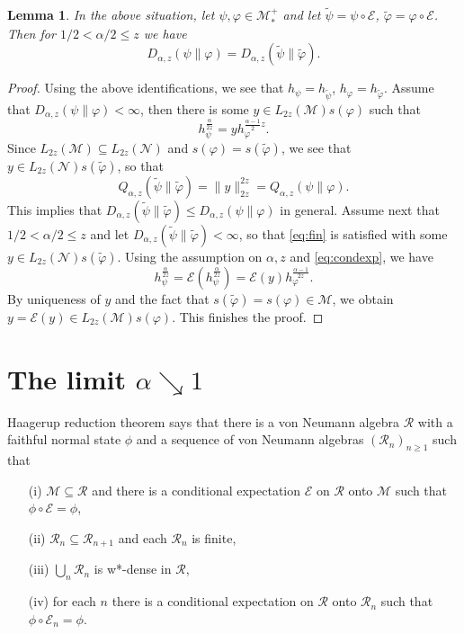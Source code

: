 \documentclass[12pt]{article}
\newtheorem{lemma}{Lemma}
\theoremstyle{definition}
\theoremstyle{remark}
\def\Me{\mathcal M}
\def\Ee{\mathcal E}
\def\Ra{\mathcal R}
\def\Ne{\mathcal N}
\begin{document}
\begin{lemma}\label{lemma:condexp} In the above situation, let $\psi,\varphi\in \Me_*^+$ and let
$\tilde\psi=\psi\circ\Ee$, $\tilde \varphi=\varphi\circ\Ee$. Then for  $1/2<\alpha/2\le z$ we
have
\[
D_{\alpha,z}(\psi\|\varphi)=D_{\alpha,z}(\tilde\psi\|\tilde\varphi).
\]

\end{lemma}


\begin{proof} Using the above identifications, we see that $h_\psi=h_{\tilde\psi}$,
$h_\varphi=h_{\tilde\varphi}$. Assume that $D_{\alpha,z}(\psi\|\varphi) <\infty$, then
there is some $y\in L_{2z}(\Me)s(\varphi)$ such that 
\begin{equation}\label{eq:fin}
h_\psi^{\frac{\alpha}{2z}}=yh_\varphi^{\frac{\alpha-1}2z}.
\end{equation}
Since $L_{2z}(\Me)\subseteq L_{2z}(\Ne)$ and $s(\varphi)=s(\tilde\varphi)$, we see that $y\in L_{2z}(\Ne)s(\tilde\varphi)$, so that
\[
Q_{\alpha,z}(\tilde\psi\|\tilde \varphi)=\|y\|_{2z}^{2z}=Q_{\alpha,z}(\psi\|\varphi).
\]
This implies that $D_{\alpha,z}(\tilde\psi\|\tilde \varphi)\le D_{\alpha,z}(\psi\|\varphi)$ in
general. Assume next that $1/2<\alpha/2\le z$ and let
$D_{\alpha,z}(\tilde\psi\|\tilde \varphi)<\infty$, so that \eqref{eq:fin} is satisfied with
some $y\in L_{2z}(\Ne)s(\tilde \varphi)$. Using the assumption on $\alpha,z$ and 
\eqref{eq:condexp}, we have
\[
h^{\frac{\alpha}{2z}}_{\psi}=\Ee(h_{\psi}^{\frac{\alpha}{2z}})=\Ee(y)h_\varphi^{\frac{\alpha-1}{2z}}.
\]
By uniqueness of $y$ and the fact
that $s(\tilde\varphi)=s(\varphi)\in \Me$, we obtain $y=\Ee(y)\in L_{2z}(\Me)s(\varphi)$.
This finishes the proof.


\end{proof}



\section{The limit $\alpha\searrow 1$}



Haagerup reduction theorem \cite[Thm. 2.1]{haagerup2010areduction} says that there is a
von Neumann algebra $\mathcal R$ with a faithful normal state $\phi$ and a sequence of von
Neumann algebras $(\Ra_n)_{n\ge 1}$ such that
\begin{enumerate}
\item[(i)] $\Me\subseteq \Ra$ and there is a conditional expectation $\Ee$ on $\Ra$ onto
$\Me$ such that $\phi\circ\Ee=\phi$,
\item[(ii)] $\Ra_n\subseteq \Ra_{n+1}$ and each $\Ra_n$ is finite,
\item[(iii)] $\bigcup_n \Ra_n$ is w*-dense in $\Ra$,
\item[(iv)] for each $n$ there is a conditional expectation on $\Ra$ onto $\Ra_n$ such
that $\phi\circ\Ee_n=\phi$.
\end{enumerate}
\end{document}
